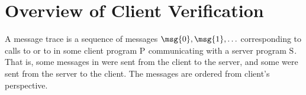 
\newcommand{\execTrace}[1]{\ensuremath{\mathrm{T}_{#1}}\xspace}
\newcommand{\program}[1]{\ensuremath{\mathrm{P}_{#1}}\xspace}
\newcommand{\server}[1]{\ensuremath{\mathrm{S}_{#1}}\xspace}
\newcommand{\clockTrace}[1]{\ensuremath{\mathrm{C}_{#1}}\xspace}
\newcommand{\memoryTrace}[1]{\ensuremath{\mathrm{V}_{#1}}\xspace}
\newcommand{\replayLog}[1]{\ensuremath{\mathrm{R}_{#1}}\xspace}
\newcommand{\lang}[1]{\ensuremath{\mathrm{L}_{#1}}\xspace}
\newcommand{\msgLang}[1]{\ensuremath{\mathrm{L}_{M}}\xspace}
\newcommand{\machine}[1]{\ensuremath{{\Lambda}_{R#1}}\xspace}
\newcommand{\symMachine}[1]{\ensuremath{\mathrm{\Lambda}_{SE#1}}\xspace}
\newcommand{\messageTrace}[1]{\ensuremath{\mathrm{M}_{#1}}\xspace}
\newcommand{\messageTraceAlt}[1]{\ensuremath{\mathrm{\hat{M}_{#1}}}\xspace}

\chapter{Overview of Client Verification}
\label{ch:overview}

%
%

\begin{definition}
  A message trace  is a sequence of messages $\msg{0},
  \msg{1}, \ldots$ corresponding to calls to \posixSend or to
  \posixRecv in some client program \program{} communicating with a server
  program \server{}. That is, some messages in
  were sent from the client to the server, and some
  were sent from the server to the client. The messages are ordered
  from client's perspective.
\end{definition}


